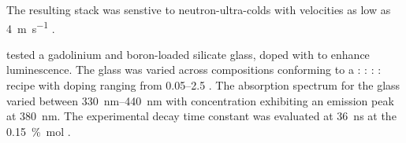 \documentclass[../../../main.tex]{subfiles}%
\begin{document}
    The resulting stack was senstive to \glspl{neutron-ultra-cold} with velocities as low as \SI{4}{\meter\per\second} \cite{Ban_2009}.
    \par%
    \citeauthor*{Park_2016} tested a gadolinium and boron-loaded silicate glass, doped with  to enhance luminescence.
    The glass was varied across compositions conforming to a  :  :  :  :  recipe with doping ranging from \SIrange{0.05}{2.5}{\percentmole} .
    The absorption spectrum for the glass varied between \SIrange{330}{440}{\nano\meter} with  concentration exhibiting an emission peak at \SI{380}{\nano\meter}.
    The experimental decay time constant was evaluated at \SI{36}{\nano\second} at the \SI{0.15}{\percent\mole}  \cite{Park_2016}.
\end{document}
